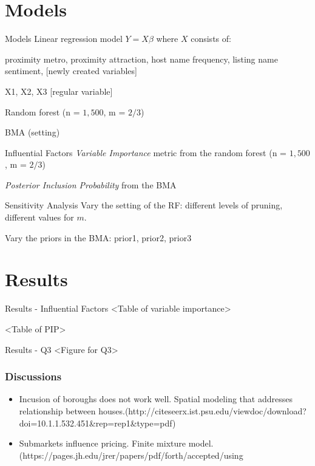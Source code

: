 \documentclass{beamer}
\begin{document}
\section{Models}
\begin{frame}{Models}
Linear regression model $Y = X \beta$
where $X$ consists of:

proximity metro, proximity attraction, host name frequency, listing name sentiment, [newly created variables]

X1, X2, X3 [regular variable]

Random forest (n = $1,500$, m = $2/3$)

BMA (setting)
\end{frame}

\begin{frame}{Influential Factors}
\textit{Variable Importance} metric from the random forest (n = $1,500$, m = $2/3$)

\textit{Posterior Inclusion Probability} from the BMA
\end{frame}

\begin{frame}{Sensitivity Analysis}
Vary the setting of the RF: different levels of pruning, different values for $m$.

Vary the priors in the BMA: prior1, prior2, prior3
\end{frame}


\section{Results}
\begin{frame}{Results - Influential Factors}
<Table of variable importance>

<Table of PIP>
\end{frame}

\begin{frame}{Results - Q3}
<Figure for Q3>
\end{frame}

\begin{frame}
    \frametitle{Discussions}

    \begin{itemize}
        \item Incusion of boroughs does not work well. Spatial modeling that addresses relationship between houses.(http://citeseerx.ist.psu.edu/viewdoc/download?doi=10.1.1.532.451&rep=rep1&type=pdf)
        \item Submarkets influence pricing. Finite mixture model. (https://pages.jh.edu/jrer/papers/pdf/forth/accepted/using%
    \end{itemize}

\end{frame}
\end{document}
